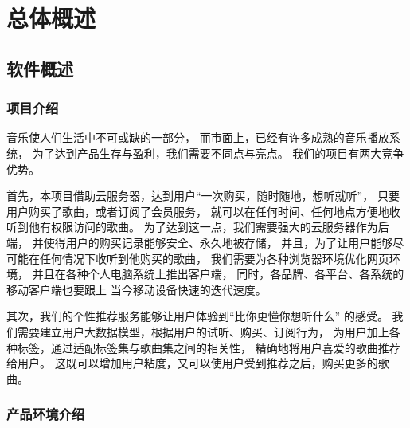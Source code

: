 \chapter{总体概述}

\section{软件概述}
\subsection{项目介绍}

音乐使人们生活中不可或缺的一部分，
    而市面上，已经有许多成熟的音乐播放系统，
    为了达到产品生存与盈利，我们需要不同点与亮点。
我们的\proname 项目有两大竞争优势。

首先，本项目借助云服务器，达到用户“一次购买，随时随地，想听就听”，
    只要用户购买了歌曲，或者订阅了会员服务，
    就可以在任何时间、任何地点方便地收听到他有权限访问的歌曲。
为了达到这一点，我们需要强大的云服务器作为后端，
    并使得用户的购买记录能够安全、永久地被存储，
    并且，为了让用户能够尽可能在任何情况下收听到他购买的歌曲，
    我们需要为各种浏览器环境优化网页环境，
    并且在各种个人电脑系统上推出客户端，
    同时，各品牌、各平台、各系统的移动客户端也要跟上
    当今移动设备快速的迭代速度。

其次，我们的个性推荐服务能够让用户体验到“\proname 比你更懂你想听什么”
    的感受。
    我们需要建立用户大数据模型，根据用户的试听、购买、订阅行为，
    为用户加上各种标签，通过适配标签集与歌曲集之间的相关性，
    精确地将用户喜爱的歌曲推荐给用户。
这既可以增加用户粘度，又可以使用户受到推荐之后，购买更多的歌曲。

\subsection{产品环境介绍}

